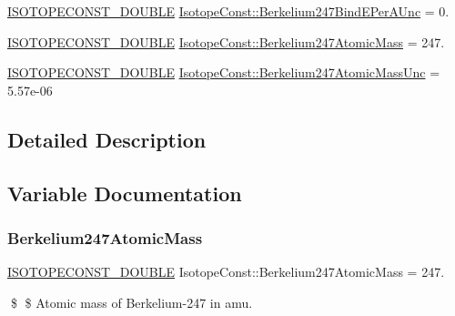 \begin{DoxyCompactItemize}
\mbox{\hyperlink{group___isotope_const-_macros_ga8f45a7272ce02c0b4c65c44636ed719a}{I\+S\+O\+T\+O\+P\+E\+C\+O\+N\+S\+T\+\_\+\+D\+O\+U\+B\+LE}} \mbox{\hyperlink{group___isotope_const-_berkelium-_bk247_ga978fc94efa3b76a180b3c0a46d021cc8}{Isotope\+Const\+::\+Berkelium247\+Bind\+E\+Per\+A\+Unc}} = 0.
\item 
\mbox{\hyperlink{group___isotope_const-_macros_ga8f45a7272ce02c0b4c65c44636ed719a}{I\+S\+O\+T\+O\+P\+E\+C\+O\+N\+S\+T\+\_\+\+D\+O\+U\+B\+LE}} \mbox{\hyperlink{group___isotope_const-_berkelium-_bk247_ga31293e32217fd5aba6d3d099b6a53919}{Isotope\+Const\+::\+Berkelium247\+Atomic\+Mass}} = 247.
\item 
\mbox{\hyperlink{group___isotope_const-_macros_ga8f45a7272ce02c0b4c65c44636ed719a}{I\+S\+O\+T\+O\+P\+E\+C\+O\+N\+S\+T\+\_\+\+D\+O\+U\+B\+LE}} \mbox{\hyperlink{group___isotope_const-_berkelium-_bk247_ga572cce58f6eb650ff0207d58bacbbfa3}{Isotope\+Const\+::\+Berkelium247\+Atomic\+Mass\+Unc}} = 5.\+57e-\/06
\end{DoxyCompactItemize}


\subsection{Detailed Description}


\subsection{Variable Documentation}
\mbox{\label{group___isotope_const-_berkelium-_bk247_ga31293e32217fd5aba6d3d099b6a53919}} 
\subsubsection{\texorpdfstring{Berkelium247\+Atomic\+Mass}{Berkelium247AtomicMass}}
{\footnotesize\ttfamily \mbox{\hyperlink{group___isotope_const-_macros_ga8f45a7272ce02c0b4c65c44636ed719a}{I\+S\+O\+T\+O\+P\+E\+C\+O\+N\+S\+T\+\_\+\+D\+O\+U\+B\+LE}} Isotope\+Const\+::\+Berkelium247\+Atomic\+Mass = 247.}

\$ \$ Atomic mass of Berkelium-\/247 in amu. \mbox{\label{group___isotope_const-_berkelium-_bk247_ga572cce58f6eb650ff0207d58bacbbfa3}} 
